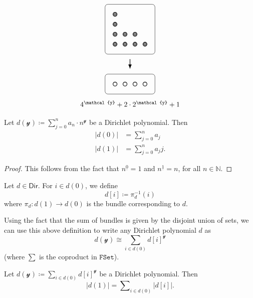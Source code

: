 \documentclass[11pt,fleqn]{article}
\newcommand{\yon}{\mathcal{y}}
\newcommand{\cat}[1]{\mathtt{#1}}
\newcommand{\rig}[1]{\mathsf{#1}}
\newcommand{\FSet}{\cat{FSet}}
\newcommand{\Dir}{\rig{Dir}}
\begin{document}
\begin{example}
\[\begin{tikzpicture}[scale=0.5]
\begin{scope}[shift={(12,0)}]
        \begin{scope}
          \draw[rounded corners] (0,0) rectangle ++(5,5);
          \foreach \y in {1,2,3,4}
            \draw[thick,black,fill=gray] (1,\y) circle (2mm);
          \foreach \y in {1,2}
            \draw[thick,black,fill=gray] (2,\y) circle (2mm);
          \foreach \y in {1,2}
            \draw[thick,black,fill=gray] (3,\y) circle (2mm);
          \draw[thick,black,fill=gray] (4,1) circle (2mm);
        \end{scope}
        \draw[thick,-Latex] (2.5,-0.5) to (2.5,-1.5);
        \begin{scope}[shift={(0,-4)}]
          \draw[rounded corners] (0,0) rectangle ++(5,2);
          \foreach \x in {1,2,3,4}
          \draw[thick,black,fill=white] (\x,1) circle (2mm);
        \end{scope}
        \node at (2.5,-5) {$4^\yon+2\cdot2^\yon+1$};
      \end{scope}
    \end{tikzpicture}
  \]
\end{example}

\begin{lemma}
\label{lemma:d0-and-d1-from-sum-form}
  Let $d(\yon)\coloneqq\sum_{j=0}^n a_n\cdot n^\yon$ be a Dirichlet polynomial.
  Then
  \[
    \begin{aligned}
      |d(0)| &= \sum\nolimits_{j=0}^n a_j
    \\|d(1)| &= \sum\nolimits_{j=0}^n a_j j.
    \end{aligned}
  \]
\end{lemma}

\begin{proof}
  This follows from the fact that $n^{\underline{0}}=1$ and $n^{\underline{1}}=n$, for all $n\in\mathbb{N}$.
\end{proof}

\begin{definition}
\label{definition:fibre-notation}
  Let $d\in\Dir$.
  For $i\in d(0)$, we define
  \[
    d[i] \coloneqq \pi_d^{-1}(i)
  \]
  where $\pi_d\colon d(1)\to d(0)$ is the bundle corresponding to $d$.
\end{definition}

Using the fact that the sum of bundles is given by the disjoint union of sets, we can use this above definition to write any Dirichlet polynomial $d$ as
\[
  d(\yon) \cong \sum_{i\in d(0)} d[i]^\yon
\]
(where $\sum$ is the coproduct in $\FSet$).

\begin{corollary}
\label{corollary:d0-and-d1-from-fibre-form}
  Let $d(\yon)\coloneqq\sum_{i\in d(0)} d[i]^\yon$ be a Dirichlet polynomial.
  Then
  \[
    |d(1)| = \sum\nolimits_{i\in d(0)} |d[i]|.
  \]
\end{corollary}
\end{document}
